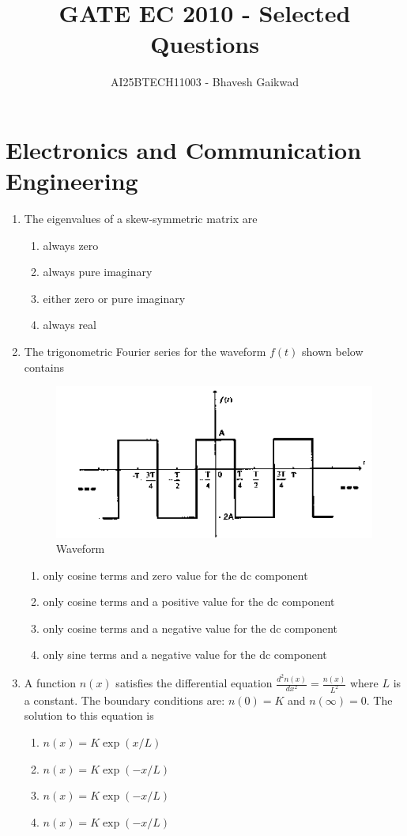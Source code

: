 \documentclass[journal,12pt,onecolumn]{IEEEtran}
\begin{document}
\title{GATE EC 2010 - Selected Questions}
\author{AI25BTECH11003 - Bhavesh Gaikwad}
\maketitle

\section*{Electronics and Communication Engineering}

\begin{enumerate}

\item The eigenvalues of a skew-symmetric matrix are
\begin{multicols}{2}
\begin{enumerate}
\item always zero
\item always pure imaginary
\item either zero or pure imaginary
\item always real
\end{enumerate}
\end{multicols}

\item The trigonometric Fourier series for the waveform $f(t)$ shown below contains
\begin{figure}[htbp]
    \centering
    \includegraphics[width=0.3\columnwidth]{figs/fig1.png}
    \caption{Waveform}
    \label{fig:figs/fig1.png}
\end{figure}
\begin{multicols}{2}
\begin{enumerate}
\item only cosine terms and zero value for the dc component
\item only cosine terms and a positive value for the dc component
\item only cosine terms and a negative value for the dc component
\item only sine terms and a negative value for the dc component
\end{enumerate}
\end{multicols}

\item A function $n(x)$ satisfies the differential equation $\frac{d^2 n(x)}{dx^2} = \frac{n(x)}{L^2}$ where $L$ is a constant. The boundary conditions are: $n(0) = K$ and $n(\infty) = 0$. The solution to this equation is
\begin{multicols}{2}
\begin{enumerate}
\item $n(x) = K \exp(x/L)$
\item $n(x) = K \exp(-x/L)$
\item $n(x) = K \exp(-x/L)$
\item $n(x) = K \exp(-x/L)$
\end{enumerate}
\end{multicols}


\end{enumerate}
\end{document}
